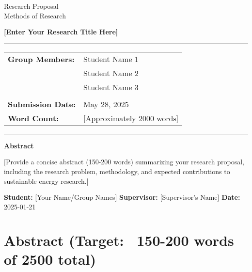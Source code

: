 \documentclass[12pt,a4paper]{article}
\newcommand{\studentone}{Student Name 1}
\newcommand{\studenttwo}{Student Name 2}
\newcommand{\studentthree}{Student Name 3}
\newcommand{\projecttitle}{[Enter Your Research Title Here]}
\newcommand{\submissiondate}{May 28, 2025}
\begin{document}
\begin{titlepage}
\begin{center}
{\Huge{Research Proposal}} \\
\vspace{5mm}
{\Large{Methods of Research}} \\

\vspace{10mm}

{\huge{\textbf{\projecttitle}}} \\

\vspace{15mm}

\hrule
\vspace{3mm}
\begin{tabular}{ll}
\textbf{Group Members:} & {\studentone} \\
& {\studenttwo} \\
& {\studentthree} \\
\\
\textbf{Submission Date:} & {\submissiondate} \\
\textbf{Word Count:} & [Approximately 2000 words] \\
\end{tabular}
\vspace{3mm}
\hrule

\vspace{15mm}

\textbf{Abstract} \\
\vspace{2mm}
\begin{minipage}{0.8\textwidth}
[Provide a concise abstract (150-200 words) summarizing your research proposal, including the research problem, methodology, and expected contributions to sustainable energy research.]
\end{minipage}

\end{center}
\end{titlepage}

\tableofcontents
\newpage


\textbf{Student:} [Your Name/Group Names]  
\textbf{Supervisor:} [Supervisor's Name]  
\textbf{Date:} 2025-01-21

\section{Abstract (Target: ~150-200 words of 2500 total)}
\end{document}
